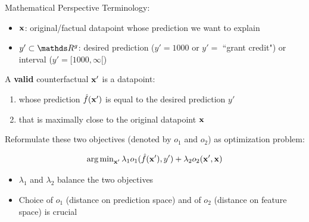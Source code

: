 \documentclass[11pt,compress,t,notes=noshow, aspectratio=169, xcolor=table, usenames,dvipsnames]{beamer}
\begin{document}
\begin{frame}{Mathematical Perspective}
	Terminology:
	\begin{itemize}
		\item $\xv$: original/factual datapoint whose prediction we want to explain
		\item $y' \subset \R^g$: desired prediction ($y' = 1000$ or $y' =$ ``grant credit") or interval ($y' = [1000, \infty[$)
	\end{itemize}
	\lz\pause
	A \textbf{valid} counterfactual $\xv'$ is a datapoint:
	\begin{enumerate}
		\item whose prediction $\fh(\xv')$ is equal to the desired prediction $y'$
		\item that is maximally close to the original datapoint $\xv$
	\end{enumerate}
	\lz\pause
	Reformulate these two objectives (denoted by $o_1$ and $o_2$) as optimization problem:
	
$$\argmin_{\xv'} \lambda_1 o_1(\fh(\xv'), y') + \lambda_2 o_2(\xv', \xv)$$

	\begin{itemize}
		\item $\lambda_1$ and $\lambda_2$ balance the two objectives
		\item Choice of $o_1$ (distance on prediction space) and of $o_2$ (distance on feature space) is crucial
	\end{itemize}
\end{frame}
\end{document}
